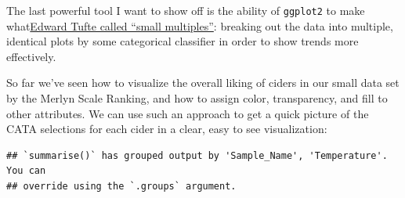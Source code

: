 \documentclass[
]{book}
\newenvironment{Shaded}{\begin{snugshade}}{\end{snugshade}}
\newcommand{\AttributeTok}[1]{\textcolor[rgb]{0.13,0.29,0.53}{#1}}
\newcommand{\ConstantTok}[1]{\textcolor[rgb]{0.56,0.35,0.01}{#1}}
\newcommand{\DecValTok}[1]{\textcolor[rgb]{0.00,0.00,0.81}{#1}}
\newcommand{\FunctionTok}[1]{\textcolor[rgb]{0.13,0.29,0.53}{\textbf{#1}}}
\newcommand{\NormalTok}[1]{#1}
\newcommand{\SpecialCharTok}[1]{\textcolor[rgb]{0.81,0.36,0.00}{\textbf{#1}}}
\newcommand{\StringTok}[1]{\textcolor[rgb]{0.31,0.60,0.02}{#1}}
\begin{document}
The last powerful tool I want to show off is the ability of \texttt{ggplot2} to make what\href{https://socviz.co/groupfacettx.html\#facet-to-make-small-multiples}{Edward Tufte called ``small multiples''}: breaking out the data into multiple, identical plots by some categorical classifier in order to show trends more effectively.

So far we've seen how to visualize the overall liking of ciders in our small data set by the Merlyn Scale Ranking, and how to assign color, transparency, and fill to other attributes. We can use such an approach to get a quick picture of the CATA selections for each cider in a clear, easy to see visualization:

\begin{Shaded}
\end{Shaded}

\begin{verbatim}
## `summarise()` has grouped output by 'Sample_Name', 'Temperature'. You can
## override using the `.groups` argument.
\end{verbatim}
\end{document}
